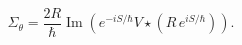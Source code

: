 \begin{equation}
\Sigma_{\theta}=\frac{2R}{\hbar}\operatorname{Im}\left(  e^{-iS/\hbar}%
V\star\left(  R\,e^{iS/\hbar}\right)  \right)  .\label{19.5}%
\end{equation}

